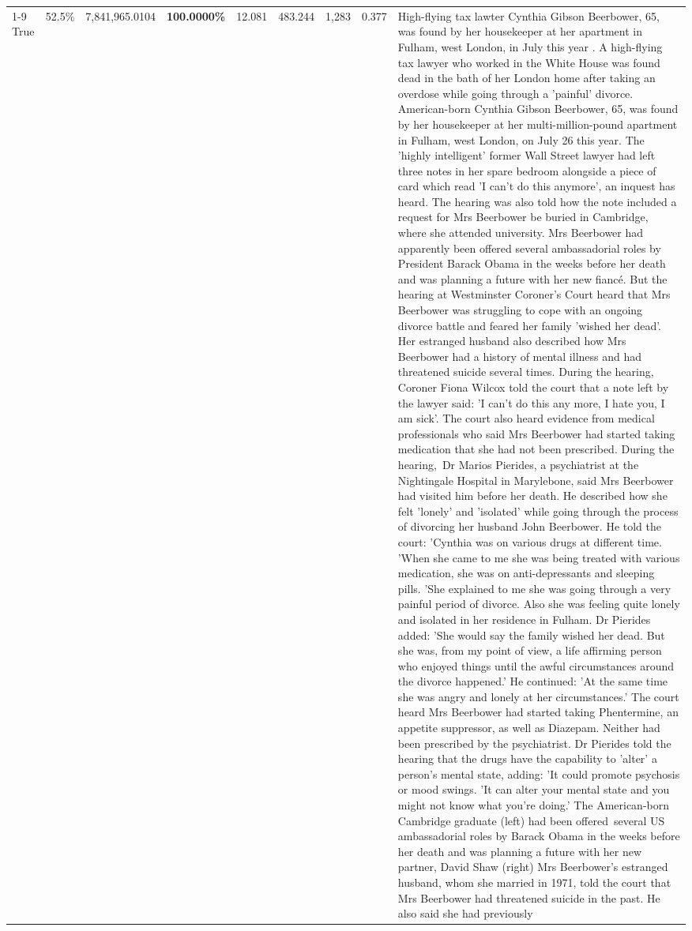 \begin{table}[H]
\begin{tabular}{lllrlllll}
\cline{1-9}
True & 52.5\% & 7,841,965.0104 & \bfseries \color{red} 100.0000\% & 12.081 & 483.244 & 1,283 & 0.377 & High-flying tax lawter Cynthia Gibson Beerbower, 65, was found by her housekeeper at her apartment in Fulham, west London, in July this year . A high-flying tax lawyer who worked in the White House was found dead in the bath of her London home after taking an overdose while going through a 'painful' divorce. American-born Cynthia Gibson Beerbower, 65, was found by her housekeeper at her multi-million-pound apartment in Fulham, west London, on July 26 this year. The 'highly intelligent' former Wall Street lawyer had left three notes in her spare bedroom alongside a piece of card which read 'I can't do this anymore', an inquest has heard. The hearing was also told how the note included a request for Mrs Beerbower be buried in Cambridge, where she attended university. Mrs Beerbower had apparently been offered several ambassadorial roles by President Barack Obama in the weeks before her death and was planning a future with her new fiancé. But the hearing at Westminster Coroner's Court heard that Mrs Beerbower was struggling to cope with an ongoing divorce battle and feared her family 'wished her dead'. Her estranged husband also described how Mrs Beerbower had a history of mental illness and had threatened suicide several times. During the hearing, Coroner Fiona Wilcox told the court that a note left by the lawyer said: 'I can't do this any more, I hate you, I am sick'. The court also heard evidence from medical professionals who said Mrs Beerbower had started taking medication that she had not been prescribed. During the hearing, Dr Marios Pierides, a psychiatrist at the Nightingale Hospital in Marylebone, said Mrs Beerbower had visited him before her death. He described how she felt 'lonely' and 'isolated' while going through the process of divorcing her husband John Beerbower. He told the court: 'Cynthia was on various drugs at different time. 'When she came to me she was being treated with various medication, she was on anti-depressants and sleeping pills. 'She explained to me she was going through a very painful period of divorce. Also she was feeling quite lonely and isolated in her residence in Fulham. Dr Pierides added: 'She would say the family wished her dead. But she was, from my point of view, a life affirming person who enjoyed things until the awful circumstances around the divorce happened.' He continued: 'At the same time she was angry and lonely at her circumstances.' The court heard Mrs Beerbower had started taking Phentermine, an appetite suppressor, as well as Diazepam. Neither had been prescribed by the psychiatrist. Dr Pierides told the hearing that the drugs have the capability to 'alter' a person's mental state, adding: 'It could promote psychosis or mood swings. 'It can alter your mental state and you might not know what you're doing.' The American-born Cambridge graduate (left) had been offered several US ambassadorial roles by Barack Obama in the weeks before her death and was planning a future with her new partner, David Shaw (right) Mrs Beerbower's estranged husband, whom she married in 1971, told the court that Mrs Beerbower had threatened suicide in the past. He also said she had previously 
\end{tabular}
\end{table}
